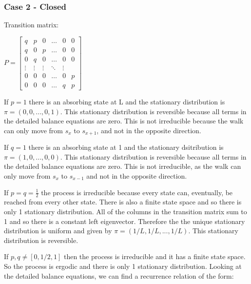 \documentclass{article}
\begin{document}
\subsubsection{Case 2 - Closed}

Transition matrix:

\bigskip

$P = \begin{bmatrix}
    q & p & 0 & \dots  & 0 & 0 \\
    q & 0 & p & \dots  & 0 & 0\\
    0 & q & 0 & \dots  & 0 & 0\\
    \vdots & \vdots & \vdots & \ddots & \vdots \\
    0 & 0 & 0 & \dots & 0 & p \\
    0 & 0 & 0 & \dots & q & p
\end{bmatrix}$

\bigskip

If $p = 1$ there is an absorbing state at L and the stationary distribution is $\pi = (0,0,...,0,1)$. This stationary distribution is reversible because all terms in the detailed balance equations are zero. This is not irreducible because the walk can only move from $s_x$ to $s_{x+1}$, and not in the opposite direction. 

\bigskip

If $q = 1$ there is an absorbing state at 1 and the stationary dsitribution is $\pi = (1,0,...,0,0)$. This stationary distribution is reversible because all terms in the detailed balance equations are zero. This is not irreducible, as the walk can only move from $s_x$ to $s_{x-1}$ and not in the opposite direction. 

\bigskip

If $p = q =\frac{1}{2}$ the process is irreducible because every state can, eventually, be reached from every other state. There is also a finite state space and so there is only 1 stationary distribution. All of the columns in the transition matrix sum to 1 and so there is a constant left eigenvector. Therefore the the unique stationary distribution is uniform and given by $\pi = (1/L, 1/L,..., 1/L)$. This stationary distribution is reversible.

\bigskip

If $p,q \neq [0,1/2,1]$ then the process is irreducible and it has a finite state space. So the process is ergodic and there is only 1 stationary distribution. Looking at the detailed balance equations, we can find a recurrence relation of the form:
\end{document}
